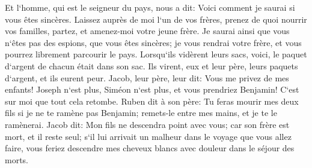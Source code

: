 \verse Et l`homme, qui est le seigneur du pays, nous a dit: Voici comment je saurai si vous êtes sincères. Laissez auprès de moi l`un de vos frères, prenez de quoi nourrir vos familles, partez, et amenez-moi votre jeune frère. 
\verse Je saurai ainsi que vous n`êtes pas des espions, que vous êtes sincères; je vous rendrai votre frère, et vous pourrez librement parcourir le pays. 
\verse Lorsqu`ils vidèrent leurs sacs, voici, le paquet d`argent de chacun était dans son sac. Ils virent, eux et leur père, leurs paquets d`argent, et ils eurent peur. 
\verse Jacob, leur père, leur dit: Vous me privez de mes enfants! Joseph n`est plus, Siméon n`est plus, et vous prendriez Benjamin! C`est sur moi que tout cela retombe. 
\verse Ruben dit à son père: Tu feras mourir mes deux fils si je ne te ramène pas Benjamin; remets-le entre mes mains, et je te le ramènerai. 
\verse Jacob dit: Mon fils ne descendra point avec vous; car son frère est mort, et il reste seul; s`il lui arrivait un malheur dans le voyage que vous allez faire, vous feriez descendre mes cheveux blancs avec douleur dans le séjour des morts. 

\chapter{}


